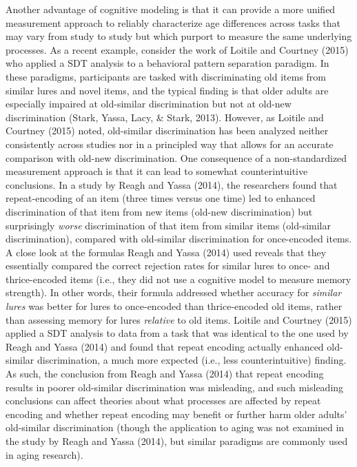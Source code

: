 \documentclass[
  english,
  ,man,floatsintext]{apa6}
\begin{document}
Another advantage of cognitive modeling is that it can provide a more unified measurement approach to reliably characterize age differences across tasks that may vary from study to study but which purport to measure the same underlying processes. As a recent example, consider the work of Loitile and Courtney (2015) who applied a SDT analysis to a behavioral pattern separation paradigm. In these paradigms, participants are tasked with discriminating old items from similar lures and novel items, and the typical finding is that older adults are especially impaired at old-similar discrimination but not at old-new discrimination (Stark, Yassa, Lacy, \& Stark, 2013). However, as Loitile and Courtney (2015) noted, old-similar discrimination has been analyzed neither consistently across studies nor in a principled way that allows for an accurate comparison with old-new discrimination. One consequence of a non-standardized measurement approach is that it can lead to somewhat counterintuitive conclusions. In a study by Reagh and Yassa (2014), the researchers found that repeat-encoding of an item (three times versus one time) led to enhanced discrimination of that item from new items (old-new discrimination) but surprisingly \emph{worse} discrimination of that item from similar items (old-similar discrimination), compared with old-similar discrimination for once-encoded items. A close look at the formulas Reagh and Yassa (2014) used reveals that they essentially compared the correct rejection rates for similar lures to once- and thrice-encoded items (i.e., they did not use a cognitive model to measure memory strength). In other words, their formula addressed whether accuracy for \emph{similar lures} was better for lures to once-encoded than thrice-encoded old items, rather than assessing memory for lures \emph{relative} to old items. Loitile and Courtney (2015) applied a SDT analysis to data from a task that was identical to the one used by Reagh and Yassa (2014) and found that repeat encoding actually enhanced old-similar discrimination, a much more expected (i.e., less counterintuitive) finding. As such, the conclusion from Reagh and Yassa (2014) that repeat encoding results in poorer old-similar discrimination was misleading, and such misleading conclusions can affect theories about what processes are affected by repeat encoding and whether repeat encoding may benefit or further harm older adults' old-similar discrimination (though the application to aging was not examined in the study by Reagh and Yassa (2014), but similar paradigms are commonly used in aging research).
\end{document}
